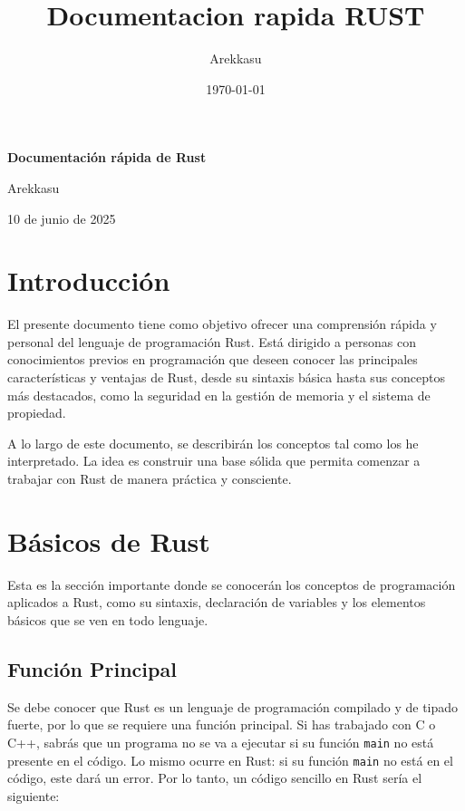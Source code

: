 \documentclass[12pt]{article}
\title{Documentacion rapida RUST}
\author{Arekkasu}
\date{\today}
\begin{document}
	\begin{titlepage}
	\centering
	\vspace*{3cm}

	{\Huge\bfseries Documentación rápida de Rust \par}
	\vspace{1.5cm}

	{\LARGE Arekkasu\par}
	\vspace{1cm}

	{\large 10 de junio de 2025\par}
	\vfill
	\end{titlepage}
	\newpage
	\tableofcontents
	\newpage

\section{Introducción}
El presente documento tiene como objetivo ofrecer una comprensión rápida y personal del lenguaje de programación Rust. Está dirigido a personas con conocimientos previos en programación que deseen conocer las principales características y ventajas de Rust, desde su sintaxis básica hasta sus conceptos más destacados, como la seguridad en la gestión de memoria y el sistema de propiedad.

A lo largo de este documento, se describirán los conceptos tal como los he interpretado. La idea es construir una base sólida que permita comenzar a trabajar con Rust de manera práctica y consciente.

\newpage
\section{Básicos de Rust}
Esta es la sección importante donde se conocerán los conceptos de programación aplicados a Rust, como su sintaxis, declaración de variables y los elementos básicos que se ven en todo lenguaje.

\subsection{Función Principal}
Se debe conocer que Rust es un lenguaje de programación compilado y de tipado fuerte, por lo que
se requiere una función principal. Si has trabajado con C o C++, sabrás que un programa no se va a ejecutar si su función \texttt{main} no está presente en el código. Lo mismo ocurre en Rust: si su función \texttt{main} no está en el código, este dará un error. Por lo tanto, un código sencillo en Rust sería el siguiente:
\end{document}
